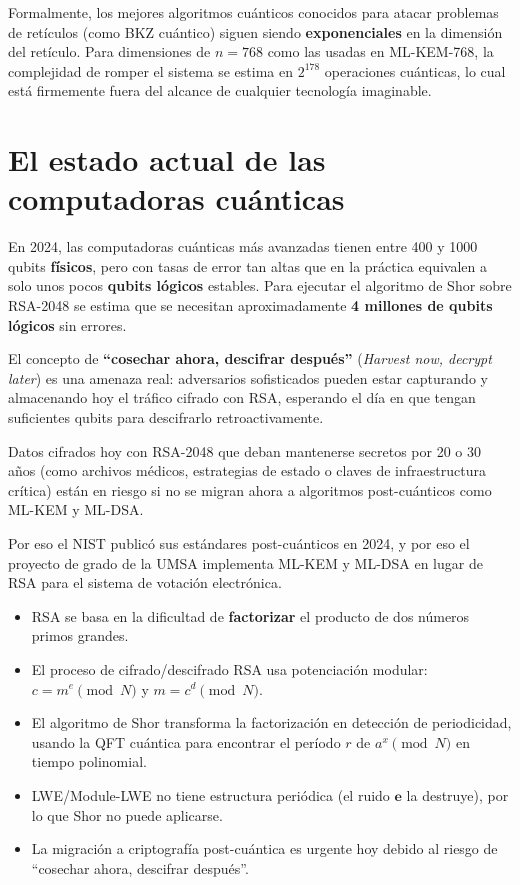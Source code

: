Formalmente, los mejores algoritmos cuánticos conocidos para atacar problemas de retículos (como BKZ cuántico) siguen siendo \textbf{exponenciales} en la dimensión del retículo. Para dimensiones de $n = 768$ como las usadas en ML-KEM-768, la complejidad de romper el sistema se estima en $2^{178}$ operaciones cuánticas, lo cual está firmemente fuera del alcance de cualquier tecnología imaginable.

\section{El estado actual de las computadoras cuánticas}

En 2024, las computadoras cuánticas más avanzadas tienen entre 400 y 1000 qubits \textbf{físicos}, pero con tasas de error tan altas que en la práctica equivalen a solo unos pocos \textbf{qubits lógicos} estables. Para ejecutar el algoritmo de Shor sobre RSA-2048 se estima que se necesitan aproximadamente \textbf{4 millones de qubits lógicos} sin errores.

\begin{intuicion}
El concepto de \textbf{``cosechar ahora, descifrar después''} (\textit{Harvest now, decrypt later}) es una amenaza real: adversarios sofisticados pueden estar capturando y almacenando hoy el tráfico cifrado con RSA, esperando el día en que tengan suficientes qubits para descifrarlo retroactivamente.

Datos cifrados hoy con RSA-2048 que deban mantenerse secretos por 20 o 30 años (como archivos médicos, estrategias de estado o claves de infraestructura crítica) están en riesgo si no se migran ahora a algoritmos post-cuánticos como ML-KEM y ML-DSA.
\end{intuicion}

Por eso el NIST publicó sus estándares post-cuánticos en 2024, y por eso el proyecto de grado de la UMSA implementa ML-KEM y ML-DSA en lugar de RSA para el sistema de votación electrónica.

\begin{resumencapitulo}
\begin{itemize}
  \item RSA se basa en la dificultad de \textbf{factorizar} el producto de dos números primos grandes.
  \item El proceso de cifrado/descifrado RSA usa potenciación modular: $c = m^e \pmod N$ y $m = c^d \pmod N$.
  \item El algoritmo de Shor transforma la factorización en detección de periodicidad, usando la QFT cuántica para encontrar el período $r$ de $a^x \pmod N$ en tiempo polinomial.
  \item LWE/Module-LWE no tiene estructura periódica (el ruido $\mathbf{e}$ la destruye), por lo que Shor no puede aplicarse.
  \item La migración a criptografía post-cuántica es urgente hoy debido al riesgo de ``cosechar ahora, descifrar después''.
\end{itemize}
\end{resumencapitulo}
